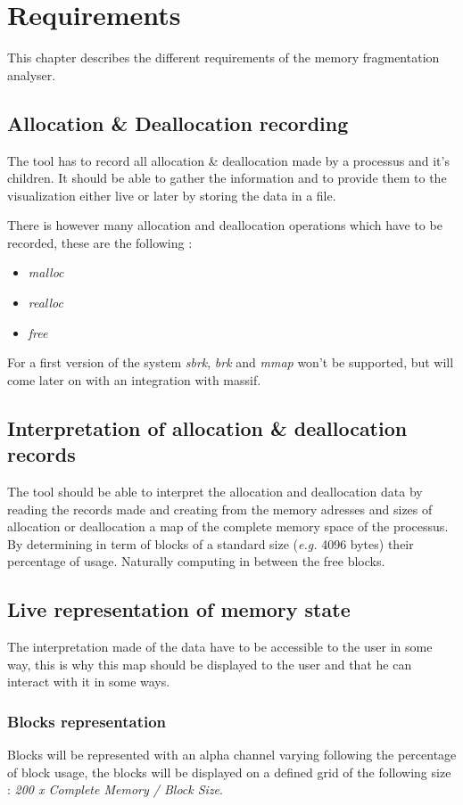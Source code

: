\chapter{Requirements}\label{chap:requirements}
This chapter describes the different requirements of the memory fragmentation analyser.

\section{Allocation \& Deallocation recording}
The tool has to record all allocation \& deallocation made by a processus and it's children. It should be able to gather the information and to provide them to the visualization either live or later by storing the data in a file.

There is however many allocation and deallocation operations which have to be recorded, these are the following :
\begin{itemize}
    \item \emph{malloc}
    \item \emph{realloc}
    \item \emph{free}
\end{itemize}

For a first version of the system \emph{sbrk}, \emph{brk} and \emph{mmap} won't be supported, but will come later on with an integration with massif.

\section{Interpretation of allocation \& deallocation records}
The tool should be able to interpret the allocation and deallocation data by reading the records made and creating from the memory adresses and sizes of allocation or deallocation a map of the complete memory space of the processus. By determining in term of blocks of a standard size (\emph{e.g.} 4096 bytes) their percentage of usage. Naturally computing in between the free blocks.

\section{Live representation of memory state}
The interpretation made of the data have to be accessible to the user in some way, this is why this map should be displayed to the user and that he can interact with it in some ways.

\subsection{Blocks representation}
Blocks will be represented with an alpha channel varying following the percentage of block usage, the blocks will be displayed on a defined grid of the following size : \emph{200 x Complete Memory / Block Size}.


